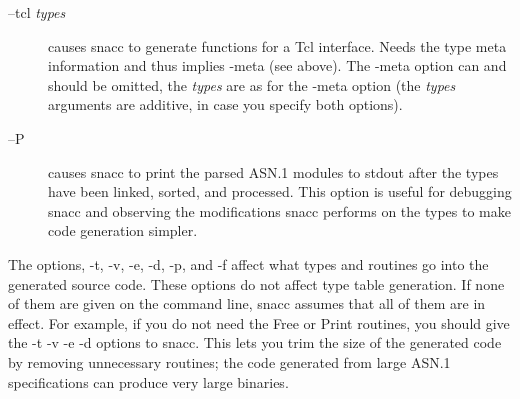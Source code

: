 \begin{description}
  \item[--tcl \emph{types}]
    causes snacc to generate functions for a Tcl interface.
    Needs the type meta information and thus implies {\ufn -meta} (see above).
    The {\ufn -meta} option can and should be omitted, the \emph{types} are as for the {\ufn -meta} option (the \emph{types} arguments are additive, in case you specify both options).

  \item[--P    ] {causes snacc to print the parsed ASN.1 modules to {\C stdout} after the types have been linked, sorted, and processed.
  This option is useful for debugging snacc and observing the modifications snacc performs on the types to make code generation simpler.}
\end{description}

The options, {\ufn -t, -v, -e, -d, -p,} and {\ufn -f} affect
what types and routines go into the generated source code.
These options do not affect type table generation. If none of
them are given on the command line, snacc assumes that all of them are
in effect.  For example, if you do not need the Free or Print
routines, you should give the {\ufn -t -v -e -d} options to snacc.
This lets you trim the size of the generated code by removing
unnecessary routines; the code generated from large ASN.1
specifications can produce very large binaries.

